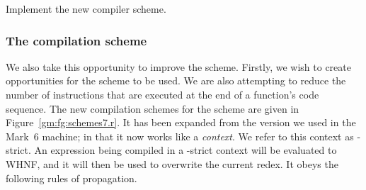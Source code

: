 \begin{exercise}\label{gm:X:e7}
Implement the new \tE{} compiler scheme.
\end{exercise}

\subsubsection{The \tR{} compilation scheme}

We also take this opportunity to improve the \tR{} scheme. Firstly, we
wish to create opportunities for the \tB{} scheme to be used. We are
also attempting to reduce the number of instructions that are executed
at the end of a function's code sequence. The new compilation schemes
for the \tR{} scheme are given in Figure~\ref{gm:fg:schemes7.r}. It has
been expanded from the version we used in the Mark~6 machine; in that
it now works like a {\em context}. We refer to this
context as \tR{}-strict. An expression being compiled in a \tR{}-strict
context will be evaluated to WHNF, and it will then be used to
overwrite the current redex. It obeys the following rules of
propagation.
